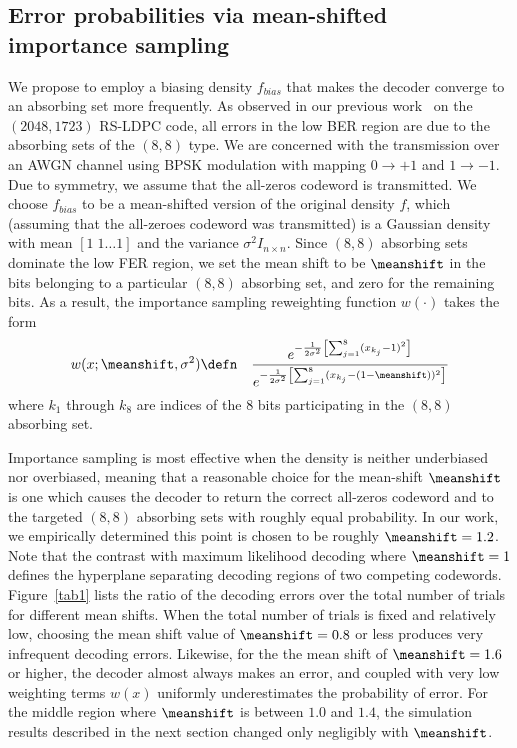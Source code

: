 \subsection{Error probabilities via mean-shifted importance sampling}

We propose to employ a biasing density $f_{bias}$ that makes the
decoder converge to an absorbing set more frequently.  As observed in
our previous work~\cite{zhang06} on the $(2048,1723)$ RS-LDPC code,
all errors in the low BER region are due to the absorbing sets of the
$(8,8)$ type.  We are concerned with the transmission over an AWGN
channel using BPSK modulation with mapping $0 \rightarrow +1$ and $1
\rightarrow -1$. Due to symmetry, we assume that the all-zeros
codeword is transmitted.  We choose $f_{bias}$ to be a mean-shifted
version of the original density $f$, which (assuming that the
all-zeroes codeword was transmitted) is a Gaussian density with mean
$[1 \; 1 \dots 1]$ and the variance $\sigma^2 I_{n \times n}$.  Since
$(8,8)$ absorbing sets dominate the low FER region, we set the mean
shift to be $\meanshift$ in the bits belonging to a particular $(8,8)$
absorbing set, and zero for the remaining bits.  As a result, the
importance sampling reweighting function $w(\cdot)$ takes the form
\begin{eqnarray}
\label{EqnDefnWeight} w(x; \meanshift, \sigma^2) & \defn &
\frac{e^{-\frac{1}{2 \sigma^2} \left[\sum_{j=1}^8 (x_{k_j}-1)^2
\right]}} {e^{-\frac{1}{2 \sigma^2} \left[\sum_{j=1}^8
(x_{k_j}-(1-\meanshift))^2\right]}}
\end{eqnarray}
where $k_1$ through $k_8$ are indices of the $8$ bits participating in
the $(8,8)$ absorbing set.

Importance sampling is most effective when the density is neither
underbiased nor overbiased, meaning that a reasonable choice for the
mean-shift $\meanshift$ is one which causes the decoder to return the
correct all-zeros codeword and to the targeted $(8,8)$ absorbing sets
with roughly equal probability.  In our work, we empirically
determined this point is chosen to be roughly $\meanshift = 1.2$. Note
that the contrast with maximum likelihood decoding where $\meanshift =
1$ defines the hyperplane separating decoding regions of two competing
codewords. Figure~\ref{tab1} lists the ratio of the decoding errors
over the total number of trials for different mean shifts. When the
total number of trials is fixed and relatively low, choosing the mean
shift value of $\meanshift = 0.8$ or less produces very infrequent
decoding errors. Likewise, for the the mean shift of $\meanshift =
1.6$ or higher, the decoder almost always makes an error, and coupled
with very low weighting terms $w(x)$ uniformly underestimates the
probability of error. For the middle region where $\meanshift$ is
between $1.0$ and $1.4$, the simulation results described in the next
section changed only negligibly with $\meanshift$.

